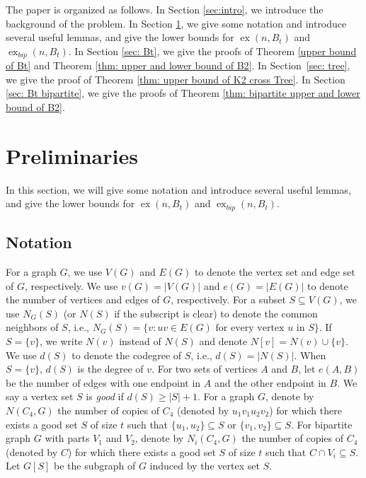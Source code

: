 \documentclass[11pt,a4paper]{article}
\theoremstyle{definition}
\DeclareMathOperator{\ex}{ex}
\begin{document}
        
        

        The paper is organized as follows.
        In Section \ref{sec:intro}, we introduce the background of the problem.
        In Section \ref{sec:lem and notation}, we give some notation and introduce several useful lemmas, and give the lower bounds for $\ex(n, B_t)$ and $\ex_{bip} (n, B_t)$.
        In Section \ref{sec: Bt}, we give the proofs of Theorem \ref{upper bound of Bt} and Theorem \ref{thm: upper and lower bound of B2}.
        In Section~\ref{sec: tree}, we give the proof of Theorem \ref{thm: upper bound of K2 cross Tree}.
        In Section \ref{sec: Bt bipartite}, we give the proofs of Theorem \ref{thm: bipartite upper and lower bound of B2}.


    \section{Preliminaries}\label{sec:lem and notation}

        In this section, we will give some notation and introduce several useful lemmas, and give the lower bounds for $\ex (n, B_t)$ and $\ex_{bip}(n, B_t)$.

        \subsection{Notation}

        For a graph $G$, we use $V(G)$ and $E(G)$ to denote the vertex set and edge set of $G$, respectively.
        We use $v(G) = |V(G)|$ and $e(G) = |E(G)|$ to denote the number of vertices and edges of $G$, respectively. 
        For a subset $S \subseteq V(G)$, we use $N_G(S)$ (or $N(S)$ if the subscript is clear) to denote the common neighbors of $S$, i.e., $N_G(S) = \{v: uv \in E(G) \text{ for every vertex $u$ in $S$}\}$.
        If $S = \{v\}$, we write $N(v)$ instead of $N(S)$ and denote $N[v] = N(v) \cup \{v\}$.
        We use $d(S)$ to denote the codegree of $S$, i.e., $d(S) = |N(S)|$.
        When $S = \{v\}$, $d(S)$ is the degree of $v$.
        For two sets of vertices $A$ and $B$, let $e(A,B)$ be the number of edges with one endpoint in $A$ and the other endpoint in $B$.
        We say a vertex set $S$ is \emph{good} if $d(S) \geq |S| + 1$.
        For a graph $G$, denote by $N(C_4, G)$ the number of copies of $C_4$ (denoted by $u_1 v_1 u_2 v_2$) for which there exists a good set $S$ of size $t$ such that $\{u_1, u_2\} \subseteq S$ or $\{v_1, v_2\} \subseteq S$.
        For bipartite graph $G$ with parts $V_1$ and $V_2$, denote by $N_i(C_4, G)$ the number of copies of $C_4$ (denoted by $C$) for which there exists a good set $S$ of size $t$ such that $C \cap V_i \subseteq S$.
        Let $G[S]$ be the subgraph of $G$ induced by the vertex set $S$.
\end{document}
